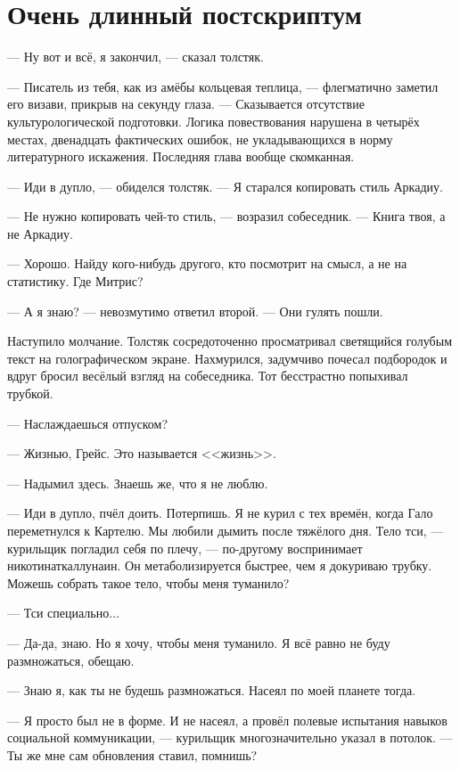 \chapter*{Очень длинный постскриптум}

\textspace

--- Ну вот и всё, я закончил, --- сказал толстяк.

--- Писатель из тебя, как из амёбы кольцевая теплица, --- флегматично заметил его визави, прикрыв на секунду глаза.
--- Сказывается отсутствие культурологической подготовки.
Логика повествования нарушена в четырёх местах, двенадцать фактических ошибок, не укладывающихся в норму литературного искажения.
Последняя глава вообще скомканная.

--- Иди в дупло, --- обиделся толстяк.
--- Я старался копировать стиль Аркадиу.

--- Не нужно копировать чей-то стиль, --- возразил собеседник.
--- Книга твоя, а не Аркадиу.

--- Хорошо.
Найду кого-нибудь другого, кто посмотрит на смысл, а не на статистику.
Где Митрис?

--- А я знаю? --- невозмутимо ответил второй.
--- Они гулять пошли.

Наступило молчание.
Толстяк сосредоточенно просматривал светящийся голубым текст на голографическом экране.
Нахмурился, задумчиво почесал подбородок и вдруг бросил весёлый взгляд на собеседника.
Тот бесстрастно попыхивал трубкой.

--- Наслаждаешься отпуском?

--- Жизнью, Грейс.
Это называется <<жизнь>>.

--- Надымил здесь.
Знаешь же, что я не люблю.

--- Иди в дупло, пчёл доить.
Потерпишь.
Я не курил с тех времён, когда Гало переметнулся к Картелю.
Мы любили дымить после тяжёлого дня.
Тело тси, --- курильщик погладил себя по плечу, --- по-другому воспринимает никотинаткаллунаин.
Он метаболизируется быстрее, чем я докуриваю трубку.
Можешь собрать такое тело, чтобы меня туманило?

--- Тси специально...

--- Да-да, знаю.
Но я хочу, чтобы меня туманило.
Я всё равно не буду размножаться, обещаю.

--- Знаю я, как ты не будешь размножаться.
Насеял по моей планете тогда.

--- Я просто был не в форме.
И не насеял, а провёл полевые испытания навыков социальной коммуникации, --- курильщик многозначительно указал в потолок.
--- Ты же мне сам обновления ставил, помнишь?

